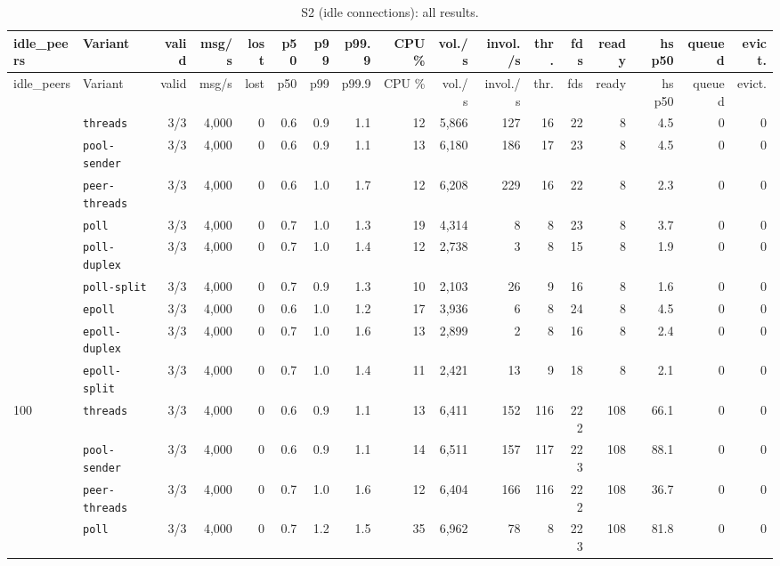 \begin{longtable}{@{}llrrrrrrrrrrrrrrr@{}}
\caption{S2 (idle connections): all results.}\label{tab:full-S2}\\
\toprule
idle\_peers & Variant & valid & msg/s & lost & p50 & p99 & p99.9 & CPU \% & vol./s & invol./s & thr. & fds & ready & hs p50 & queued & evict. \\
\midrule
\endfirsthead
\toprule
idle\_peers & Variant & valid & msg/s & lost & p50 & p99 & p99.9 & CPU \% & vol./s & invol./s & thr. & fds & ready & hs p50 & queued & evict. \\
\midrule
\endhead
\bottomrule
\endfoot
0 & \texttt{threads} & 3/3 & 4{,}000 & 0 & 0.6 & 0.9 & 1.1 & 12 & 5{,}866 & 127 & 16 & 22 & 8 & 4.5 & 0 & 0 \\
 & \texttt{pool-sender} & 3/3 & 4{,}000 & 0 & 0.6 & 0.9 & 1.1 & 13 & 6{,}180 & 186 & 17 & 23 & 8 & 4.5 & 0 & 0 \\
 & \texttt{peer-threads} & 3/3 & 4{,}000 & 0 & 0.6 & 1.0 & 1.7 & 12 & 6{,}208 & 229 & 16 & 22 & 8 & 2.3 & 0 & 0 \\
 & \texttt{poll} & 3/3 & 4{,}000 & 0 & 0.7 & 1.0 & 1.3 & 19 & 4{,}314 & 8 & 8 & 23 & 8 & 3.7 & 0 & 0 \\
 & \texttt{poll-duplex} & 3/3 & 4{,}000 & 0 & 0.7 & 1.0 & 1.4 & 12 & 2{,}738 & 3 & 8 & 15 & 8 & 1.9 & 0 & 0 \\
 & \texttt{poll-split} & 3/3 & 4{,}000 & 0 & 0.7 & 0.9 & 1.3 & 10 & 2{,}103 & 26 & 9 & 16 & 8 & 1.6 & 0 & 0 \\
 & \texttt{epoll} & 3/3 & 4{,}000 & 0 & 0.6 & 1.0 & 1.2 & 17 & 3{,}936 & 6 & 8 & 24 & 8 & 4.5 & 0 & 0 \\
 & \texttt{epoll-duplex} & 3/3 & 4{,}000 & 0 & 0.7 & 1.0 & 1.6 & 13 & 2{,}899 & 2 & 8 & 16 & 8 & 2.4 & 0 & 0 \\
 & \texttt{epoll-split} & 3/3 & 4{,}000 & 0 & 0.7 & 1.0 & 1.4 & 11 & 2{,}421 & 13 & 9 & 18 & 8 & 2.1 & 0 & 0 \\
\midrule
100 & \texttt{threads} & 3/3 & 4{,}000 & 0 & 0.6 & 0.9 & 1.1 & 13 & 6{,}411 & 152 & 116 & 222 & 108 & 66.1 & 0 & 0 \\
 & \texttt{pool-sender} & 3/3 & 4{,}000 & 0 & 0.6 & 0.9 & 1.1 & 14 & 6{,}511 & 157 & 117 & 223 & 108 & 88.1 & 0 & 0 \\
 & \texttt{peer-threads} & 3/3 & 4{,}000 & 0 & 0.7 & 1.0 & 1.6 & 12 & 6{,}404 & 166 & 116 & 222 & 108 & 36.7 & 0 & 0 \\
 & \texttt{poll} & 3/3 & 4{,}000 & 0 & 0.7 & 1.2 & 1.5 & 35 & 6{,}962 & 78 & 8 & 223 & 108 & 81.8 & 0 & 0 \\

\end{longtable}
